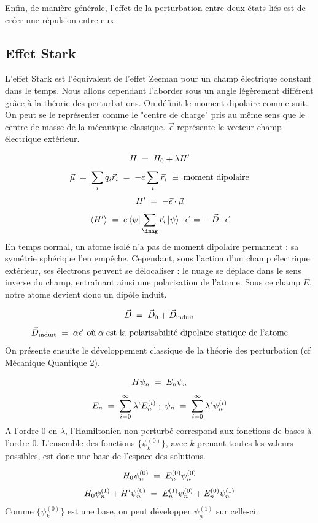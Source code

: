 Enfin, de manière générale, l'effet de la perturbation entre deux états liés est de créer une répulsion entre eux.




\subsection{Effet Stark}

L'effet Stark est l'équivalent de l'effet Zeeman pour un champ électrique constant dans le temps. Nous allons cependant l'aborder sous un angle légèrement différent grâce à la théorie des perturbations. On définit le moment dipolaire comme suit. On peut se le représenter comme le "centre de charge" pris au même sens que le centre de masse de la mécanique classique. $\vec{\epsilon}$ représente le vecteur champ électrique extérieur.

\[
    H \; = \; H_0 + \lambda H'
\]
\[
    \vec{\mu} \; = \; \sum_i q_i \vec{r}_i \; = \; -e\sum_i \vec{r}_i\;\equiv\; \textrm{moment dipolaire}
\]
\[
    H' \; = \; -\vec{\epsilon}\cdot\vec{\mu}
\]
\[
    \expval{H'} \eq e\bra{\psi}\sum_\imag\vec{r}_i\ket{\psi}\cdot \vec{\epsilon} \eq -\vec{D}\cdot\vec{\epsilon}
\]
En temps normal, un atome isolé n'a pas de moment dipolaire permanent : sa symétrie sphérique l'en empêche. Cependant, sous l'action d'un champ électrique extérieur, ses électrons peuvent se délocaliser : le nuage se déplace dans le sens inverse du champ, entraînant ainsi une polarisation de l'atome. Sous ce champ $E$, notre atome devient donc un dipôle induit.

\[
    \vec{D} \; = \; \vec{D}_0 + \vec{D}_\text{induit}
\]
\[
    \vec{D}_\text{induit} \; = \; \alpha \vec{\epsilon} \;\; \text{où}\; \alpha \; \text{est la polarisabilité dipolaire statique de l'atome}
\]
On présente ensuite le développement classique de la théorie des perturbation (cf Mécanique Quantique 2).

\[
    H\psi_n \; = \; E_n \psi_n
\]
\[
    E_n \; = \; \sum_{i=0}^{\infty} \lambda^i E_n^{(i)}\; ; \; \psi_n \; = \; \sum_{i=0}^{\infty} \lambda^i \psi_n^{(i)}
\]
A l'ordre 0 en $\lambda$, l'Hamiltonien non-perturbé correspond aux fonctions de bases à l'ordre 0. L'ensemble des fonctions $\{\psi_k^{(0)}\}$, avec $k$ prenant toutes les valeurs possibles, est donc une base de l'espace des solutions.

\[
    H_0 \psi_n^{(0)} \; = \; E_n^{(0)} \psi_n^{(0)}
\]
\[
    H_0 \psi_n^{(1)} + H' \psi_n^{(0)} \; = \; E_n^{(1)} \psi_n^{(0)} + E_n^{(0)} \psi_n^{(1)}
\]
Comme $\{\psi_k^{(0)}\}$ est une base, on peut développer $\psi_n^{(1)}$ sur celle-ci.

